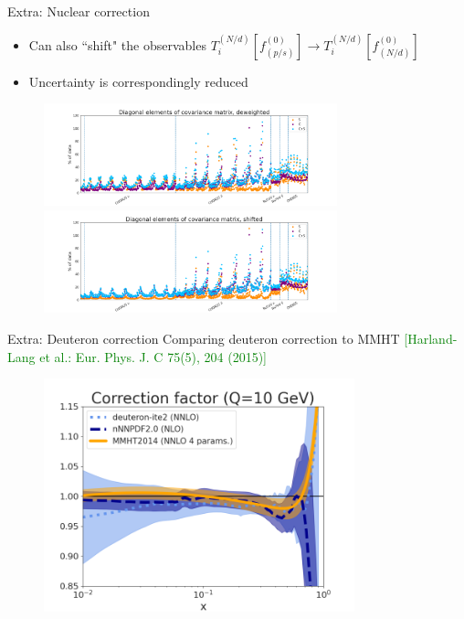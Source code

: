 \begin{frame}{Extra: Nuclear correction}
\begin{itemize}
\item Can also ``shift" the observables $T_i^{(N/d)}[f_(p/s)^{(0)}] \to T_i^{(N/d)}[f_{(N/d)}^{(0)}]$
\item Uncertainty is correspondingly reduced
\end{itemize}
  \begin{figure}
    \includegraphics[width=85mm]{nuclear_uncs/diagnuc_title.png}
    \includegraphics[width=85mm]{nuclear_uncs/diagnucshift.png}
  \end{figure}
\end{frame}
\begin{frame}{Extra: Deuteron correction}
Comparing deuteron correction to MMHT \tiny{ \textcolor{green}{[Harland-Lang et al.: Eur. Phys. J. C 75(5), 204 (2015)]}}
  \begin{figure}
    \includegraphics[width=90mm]{nuclear_uncs/corrfactor.png}
  \end{figure}
\end{frame}

